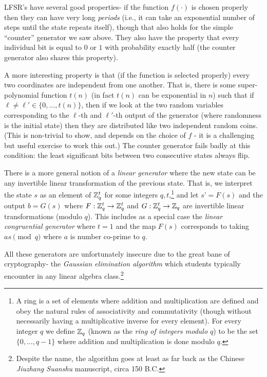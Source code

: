LFSR's have several good properties- if the function \(f(\cdot)\) is
chosen properly then they can have very long \emph{periods} (i.e., it
can take an exponential number of steps until the state repeats itself),
though that also holds for the simple ``counter'' generator we saw
above. They also have the property that every individual bit is equal to
\(0\) or \(1\) with probability exactly half (the counter generator also
shares this property).

A more interesting property is that (if the function is selected
properly) every two coordinates are independent from one another. That
is, there is some super-polynomial function \(t(n)\) (in fact \(t(n)\)
can be exponential in \(n\)) such that if
\(\ell \neq \ell' \in \{0,\ldots, t(n) \}\), then if we look at the two
random variables corresponding to the \(\ell\)-th and \(\ell'\)-th
output of the generator (where randomness is the initial state) then
they are distributed like two independent random coins. (This is
non-trivial to show, and depends on the choice of \(f\) - it is a
challenging but useful exercise to work this out.) The counter generator
fails badly at this condition: the least significant bits between two
consecutive states always flip.

There is a more general notion of a \emph{linear generator} where the
new state can be any invertible linear transformation of the previous
state. That is, we interpret the state \(s\) as an element of \({\mathbb{Z}}_q^t\)
for some integers \(q,t\),\footnote{A ring is a set of elements where
  addition and multiplication are defined and obey the natural rules of
  associativity and commutativity (though without necessarily having a
  multiplicative inverse for every element). For every integer \(q\) we
  define \({\mathbb{Z}}_q\) (known as the \emph{ring of integers modulo \(q\)}) to
  be the set \(\{0,\ldots,q-1\}\) where addition and multiplication is
  done modulo \(q\).} and let \(s’=F(s)\) and the output \(b=G(s)\)
where \(F:{\mathbb{Z}}_q^t\rightarrow{\mathbb{Z}}_q^t\) and \(G:{\mathbb{Z}}_q^t\rightarrow{\mathbb{Z}}_q\) are
invertible linear transformations (modulo \(q\)). This includes as a
special case the \emph{linear congruential generator} where \(t=1\) and
the map \(F(s)\) corresponds to taking \(as \pmod{q}\) where \(a\) is
number co-prime to \(q\).

All these generators are unfortunately insecure due to the great bane of
cryptography- the \emph{Gaussian elimination algorithm} which students
typically encounter in any linear algebra class.\footnote{Despite the
  name, the algorithm goes at least as far back as the Chinese
  \emph{Jiuzhang Suanshu} manuscript, circa 150 B.C.}

